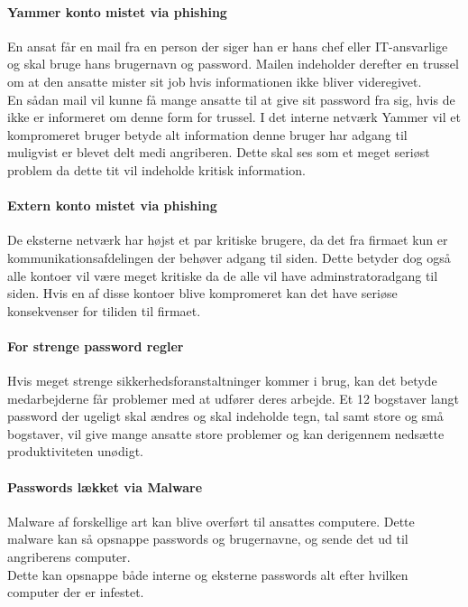 \documentclass{article}
\begin{document}
\paragraph{Yammer konto mistet via phishing}
En ansat får en mail fra en person der siger han er hans chef eller
IT-ansvarlige og skal bruge hans brugernavn og password. Mailen 
indeholder derefter en trussel om at den ansatte mister sit job hvis 
informationen ikke bliver videregivet.\\
En sådan mail vil kunne få mange ansatte til at give sit password fra
sig, hvis de ikke er informeret om denne form for trussel. 
I det interne netværk Yammer vil et kompromeret bruger betyde alt information
denne bruger har adgang til muligvist er blevet delt medi angriberen. 
Dette skal ses som et meget seriøst problem da dette tit vil indeholde kritisk information.

\paragraph{Extern konto mistet via phishing}
De eksterne netværk har højst et par kritiske brugere, da det fra firmaet kun er 
kommunikationsafdelingen der behøver adgang til siden. Dette betyder dog også
alle kontoer vil være meget kritiske da de alle vil have adminstratoradgang til
siden. Hvis en af disse kontoer blive kompromeret kan det have seriøse konsekvenser
for tiliden til firmaet.

\paragraph{For strenge password regler}
Hvis meget strenge sikkerhedsforanstaltninger kommer i brug, kan det betyde
medarbejderne får problemer med at udfører deres arbejde. Et 12 bogstaver langt
password der ugeligt skal ændres og skal indeholde tegn, tal samt store og små
bogstaver, vil give mange ansatte store problemer og kan derigennem nedsætte
produktiviteten unødigt.

\paragraph{Passwords lækket via Malware}
Malware af forskellige art kan blive overført til ansattes computere. Dette malware
kan så opsnappe passwords og brugernavne, og sende det ud til angriberens computer.\\
Dette kan opsnappe både interne og eksterne passwords alt efter hvilken computer der
er infestet. 
\end{document}
